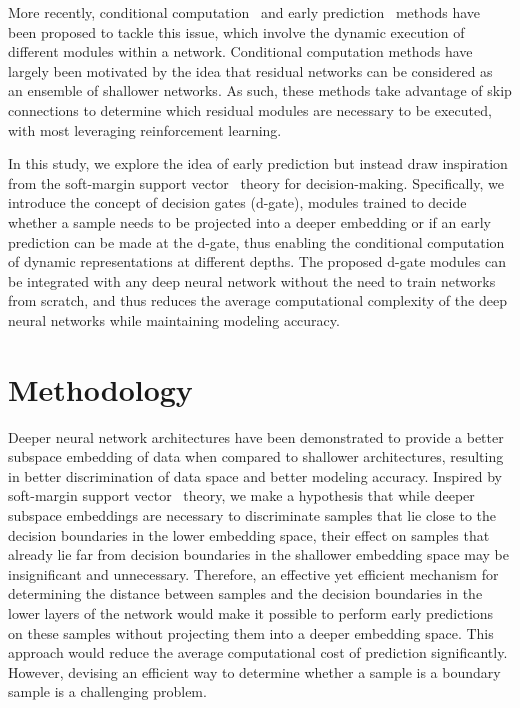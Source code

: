 \documentclass{article}
\begin{document}
More recently, conditional computation~\cite{bengio2015conditional,denoyer2014deep,liu2017dynamic,wu2018blockdrop,bolukbasi2017adaptive} and early prediction~\cite{teerapittayanon2016branchynet} methods have been proposed to tackle this issue, which involve the dynamic execution of different modules within a network. Conditional computation methods have largely been motivated by the idea that residual networks can be considered as an ensemble of shallower networks.  As such, these methods take advantage of skip connections to determine which residual modules are necessary to be executed, with most leveraging reinforcement learning.

In this study, we explore the idea of early prediction but instead draw inspiration from the soft-margin support vector~\cite{cortes1995support} theory for decision-making.  Specifically, we introduce the concept of decision gates (d-gate), modules trained to decide whether a sample needs to be projected into a deeper embedding or if an early prediction can be made at the d-gate, thus enabling the conditional computation of dynamic representations at different depths.  The proposed d-gate modules can be integrated with any deep neural network without the need to train networks from scratch, and thus reduces the average computational complexity of the deep neural networks while maintaining modeling accuracy.

\vspace{-0.4 cm}
\section{Methodology}
\label{sec:Method}
\vspace{-0.4 cm}
Deeper neural network architectures have been demonstrated to provide a better subspace embedding of data when compared to shallower architectures, resulting in better discrimination of data space and better modeling accuracy. Inspired by soft-margin support vector~\cite{cortes1995support} theory, we make a hypothesis that while deeper subspace embeddings are necessary to discriminate samples that lie close to the decision boundaries in the lower embedding space, their effect on samples that already lie far from decision boundaries in the shallower embedding space may be insignificant and unnecessary. Therefore, an effective yet efficient mechanism for determining the distance between samples and the decision boundaries in the lower layers of the network would make it possible to perform early predictions on these samples without projecting them into a deeper embedding space. This approach would reduce the average computational cost of prediction significantly. However, devising an efficient way to determine whether a sample is a boundary sample is a challenging problem.
\end{document}
